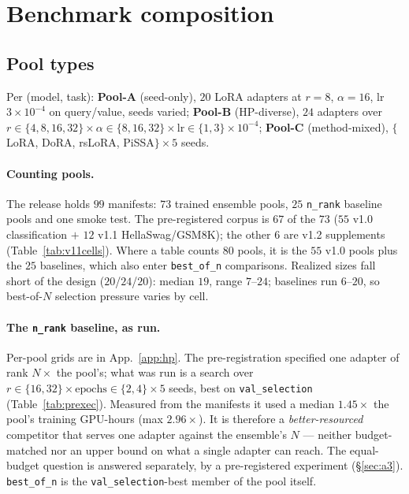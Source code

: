 \documentclass[11pt]{article}
\begin{document}
\section{Benchmark composition}\label{sec:setup}

\subsection{Pool types}

Per (model, task): \textbf{Pool-A} (seed-only), $20$ LoRA adapters at $r{=}8$, $\alpha{=}16$, lr $3{\times}10^{-4}$ on query/value, seeds varied; \textbf{Pool-B} (HP-diverse), $24$ adapters over $r{\in}\{4,8,16,32\}\times\alpha{\in}\{8,16,32\}\times$lr$\in\{1,3\}{\times}10^{-4}$; \textbf{Pool-C} (method-mixed), $\{$LoRA, DoRA, rsLoRA, PiSSA$\}\times5$ seeds.

\paragraph{Counting pools.} The release holds $99$ manifests: $73$ trained ensemble pools, $25$ \texttt{n\_rank} baseline pools and one smoke test. The pre-registered corpus is $67$ of the $73$ ($55$ v1.0 classification $+$ $12$ v1.1 HellaSwag/GSM8K); the other $6$ are v1.2 supplements (Table~\ref{tab:v11cells}). Where a table counts $80$ pools, it is the $55$ v1.0 pools plus the $25$ baselines, which also enter \texttt{best\_of\_n} comparisons. Realized sizes fall short of the design ($20$/$24$/$20$): median $19$, range $7$--$24$; baselines run $6$--$20$, so best-of-$N$ selection pressure varies by cell.

\paragraph{The \texttt{n\_rank} baseline, as run.} Per-pool grids are in App.~\ref{app:hp}. The pre-registration specified one adapter of rank $N\times$ the pool's; what was run is a search over $r{\in}\{16, 32\} \times \text{epochs}{\in}\{2, 4\} \times 5$ seeds, best on \texttt{val\_selection} (Table~\ref{tab:prexec}). Measured from the manifests it used a median $1.45\times$ the pool's training GPU-hours (max $2.96\times$). It is therefore a \emph{better-resourced} competitor that serves one adapter against the ensemble's $N$ --- neither budget-matched nor an upper bound on what a single adapter can reach. The equal-budget question is answered separately, by a pre-registered experiment (\S\ref{sec:a3}). \texttt{best\_of\_n} is the \texttt{val\_selection}-best member of the pool itself.
\end{document}

